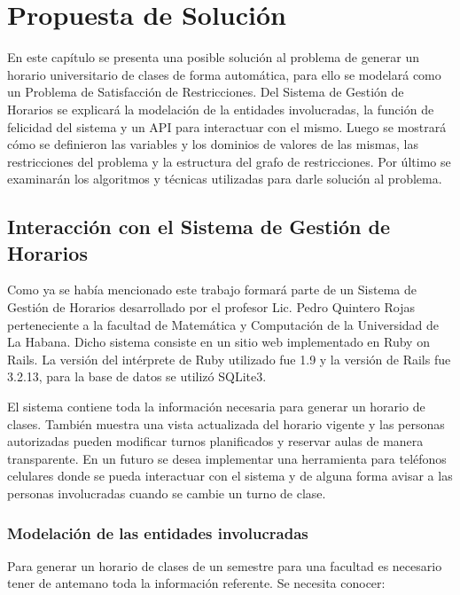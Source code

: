\chapter{Propuesta de Solución}

En este cap\'itulo se presenta una posible soluci\'on al problema de generar un horario universitario de clases de forma autom\'atica, para ello se modelar\'a como un Problema de Satisfacci\'on de Restricciones. Del Sistema de Gesti\'on de Horarios se explicar\'a la modelaci\'on de la entidades involucradas, la funci\'on de felicidad del sistema y un API para interactuar con el mismo. Luego se mostrar\'a c\'omo se definieron las variables y los dominios de valores de las mismas, las restricciones del problema y la estructura del grafo de restricciones. Por \'ultimo se examinar\'an los algoritmos y t\'ecnicas utilizadas para darle soluci\'on al problema.

\section{Interacci\'on con el Sistema de Gesti\'on de Horarios}

Como ya se hab\'ia mencionado este trabajo formar\'a parte de un Sistema de Gesti\'on de Horarios desarrollado por el profesor Lic. Pedro Quintero Rojas perteneciente a la facultad de Matem\'atica y Computaci\'on de la Universidad de La Habana. Dicho sistema consiste en un sitio web implementado en Ruby on Rails. La versi\'on del int\'erprete de Ruby utilizado fue 1.9 y la versi\'on de Rails fue 3.2.13, para la base de datos se utiliz\'o SQLite3.

El sistema contiene toda la informaci\'on necesaria para generar un horario de clases. Tambi\'en muestra una vista actualizada del horario vigente y las personas autorizadas pueden modificar turnos planificados y reservar aulas de manera transparente. En un futuro se desea implementar una herramienta para tel\'efonos celulares donde se pueda interactuar con el sistema y de alguna forma avisar a las personas involucradas cuando se cambie un turno de clase. 

\subsection{Modelaci\'on de las entidades involucradas}

Para generar un horario de clases de un semestre para una facultad es necesario tener de antemano toda la informaci\'on referente. Se necesita conocer:

